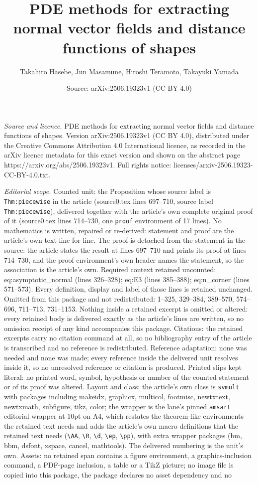\documentclass[10pt,a4paper]{amsart}
\title[PDE methods for extracting normal vector fields and distance]{PDE methods for extracting normal vector fields and distance functions of shapes}
\author{Takahiro Hasebe, Jun Masamune, Hiroshi Teramoto, Takayuki Yamada}
\date{Source: arXiv:2506.19323v1 (CC BY 4.0)}
\begin{document}
\maketitle

\noindent\emph{Source and licence.} PDE methods for extracting normal vector fields and distance functions of shapes. Version arXiv:2506.19323v1 (CC BY 4.0), distributed under the Creative Commons Attribution 4.0 International licence, as recorded in the arXiv licence metadata for this exact version and shown on the abstract page https://arxiv.org/abs/2506.19323v1. Full rights notice: licenses/arxiv-2506.19323-CC-BY-4.0.txt.\par\smallskip

\noindent\textit{Editorial scope.} Counted unit: the Proposition whose source label is \texttt{Thm:piecewise} in the article (source0.tex lines 697--710, source label \texttt{Thm:piecewise}), delivered together with the article's own complete original proof of it (source0.tex lines 714--730, one \texttt{proof} environment of 17 lines). No mathematics is written, repaired or re-derived: statement and proof are the article's own text line for line. The proof is detached from the statement in the source: the article states the result at lines 697--710 and prints its proof at lines 714--730, and the proof environment's own header names the statement, so the association is the article's own. Required context retained uncounted: eq:asymptotic\_normal (lines 326--328); eq:E3 (lines 385--388); eq:n\_corner (lines 571--573). Every definition, display and label of those lines is retained unchanged. Omitted from this package and not redistributed: 1--325, 329--384, 389--570, 574--696, 711--713, 731--1153. Nothing inside a retained excerpt is omitted or altered: every retained body is delivered exactly as the article's lines are written, so no omission receipt of any kind accompanies this package. Citations: the retained excerpts carry no citation command at all, so no bibliography entry of the article is transcribed and no reference is redistributed. Reference adaptation: none was needed and none was made; every reference inside the delivered unit resolves inside it, so no unresolved reference or citation is produced. Printed slips kept literal: no printed word, symbol, hypothesis or number of the counted statement or of its proof was altered. Layout and class: the article's own class is \texttt{svmult} with packages including makeidx, graphicx, multicol, footmisc, newtxtext, newtxmath, subfigure, tikz, color; the wrapper is the lane's pinned \texttt{amsart} editorial wrapper at 10pt on A4, which restates the theorem-like environments the retained text needs and adds the article's own macro definitions that the retained text needs (\texttt{\textbackslash AA}, \texttt{\textbackslash R}, \texttt{\textbackslash d}, \texttt{\textbackslash ep}, \texttt{\textbackslash pp}), with extra wrapper packages (bm, bbm, dsfont, xspace, cancel, mathtools). The delivered numbering is the unit's own. Assets: no retained span contains a figure environment, a graphics-inclusion command, a PDF-page inclusion, a table or a TikZ picture; no image file is copied into this package, the package declares no asset dependency and no 
\end{document}
